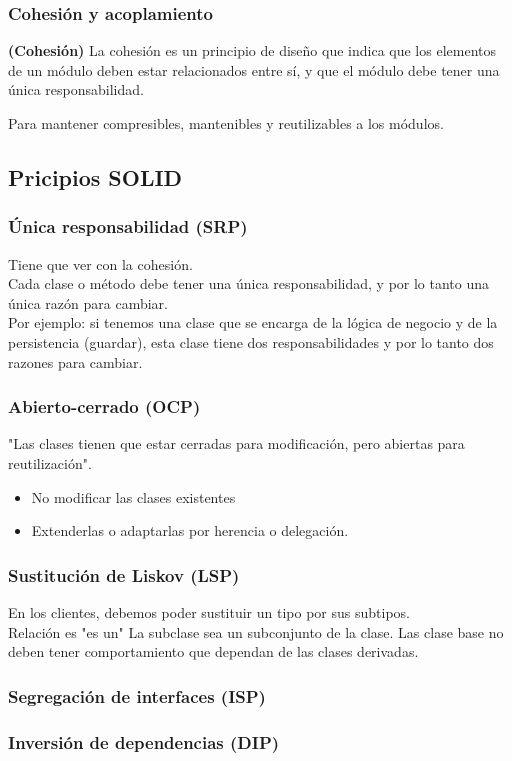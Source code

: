 \documentclass[../main.tex]{subfiles}
\begin{document}
        \subsubsection{Cohesión y acoplamiento}
            \begin{definition} \textbf{(Cohesión)}
                La cohesión es un principio de diseño que indica que los elementos de un módulo deben estar relacionados entre sí, y que el módulo debe tener una única responsabilidad.
            \end{definition}

            Para mantener compresibles, mantenibles y reutilizables a los módulos.
    
    \subsection{Pricipios SOLID}
        \subsubsection{Única responsabilidad (SRP)}
            Tiene que ver con la cohesión.\\

            Cada clase o método debe tener una única responsabilidad, y por lo tanto una única razón para cambiar.\\
            
            Por ejemplo: si tenemos una clase que se encarga de la lógica de negocio y de la persistencia (guardar), esta clase tiene dos responsabilidades y por lo tanto dos razones para cambiar.\\

        \subsubsection{Abierto-cerrado (OCP)}
            "Las clases tienen que estar cerradas para modificación, pero abiertas para reutilización".\\

            \begin{itemize}
                \item No modificar las clases existentes
                \item Extenderlas o adaptarlas por herencia o delegación.
            \end{itemize}

        \subsubsection{Sustitución de Liskov (LSP)}
            En los clientes, debemos poder sustituir un tipo por sus subtipos.\\
            Relación es "es un"
            La subclase sea un subconjunto de la clase.
            Las clase base no deben tener comportamiento que dependan de las clases derivadas.\\
            
        \subsubsection{Segregación de interfaces (ISP)}
        \subsubsection{Inversión de dependencias (DIP)}
\end{document}
